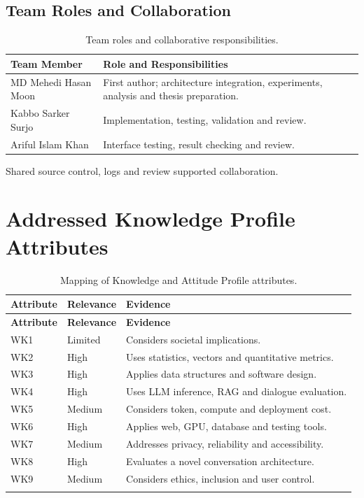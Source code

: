 \subsection{Team Roles and Collaboration}
\begin{table}[H]
\centering
\caption{Team roles and collaborative responsibilities.}
\label{tab:annexA_team_roles}
\small
\begin{tabular}{p{}p{}}
\toprule
\textbf{Team Member} & \textbf{Role and Responsibilities} \\
\midrule
MD Mehedi Hasan Moon & First author; architecture integration, experiments, analysis and thesis preparation. \\
Kabbo Sarker Surjo & Implementation, testing, validation and review. \\
Ariful Islam Khan & Interface testing, result checking and review. \\
\bottomrule
\end{tabular}
\end{table}

Shared source control, logs and review supported collaboration.

\section{Addressed Knowledge Profile Attributes}
\begin{longtable}{p{}p{}p{}}
\caption{Mapping of Knowledge and Attitude Profile attributes.}\label{tab:annexA_wk}\\
\toprule
\textbf{Attribute} & \textbf{Relevance} & \textbf{Evidence} \\
\midrule
\endfirsthead
\toprule
\textbf{Attribute} & \textbf{Relevance} & \textbf{Evidence} \\
\midrule
\endhead
WK1 & Limited & Considers societal implications. \\
WK2 & High & Uses statistics, vectors and quantitative metrics. \\
WK3 & High & Applies data structures and software design. \\
WK4 & High & Uses LLM inference, RAG and dialogue evaluation. \\
WK5 & Medium & Considers token, compute and deployment cost. \\
WK6 & High & Applies web, GPU, database and testing tools. \\
WK7 & Medium & Addresses privacy, reliability and accessibility. \\
WK8 & High & Evaluates a novel conversation architecture. \\
WK9 & Medium & Considers ethics, inclusion and user control. \\
\botrule
\end{longtable}

